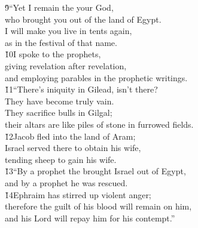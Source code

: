 \begin{poetry}
\poeml \v{9}``Yet I remain the  your God, \\
\poemll    who brought you out of the land of Egypt. \\
\poeml I will make you live in tents again, \\
\poemll    as in the festival of that name. \\
\poeml \v{10}I spoke to the prophets, \\
\poemll    giving revelation after revelation, \\
\poemlll       and employing parables in the prophetic writings. \\
\poeml \v{11}``There's iniquity in Gilead, isn't there? \\
\poemll    They have become truly vain. \\
\poeml They sacrifice bulls in Gilgal; \\
\poemll    their altars are like piles of stone in furrowed fields. \\
\poeml \v{12}Jacob fled into the land of Aram; \\
\poemll    Israel served there to obtain his wife, \\
\poemlll       tending sheep to gain his wife. \\
\poeml \v{13}``By a prophet the  brought Israel out of Egypt, \\
\poemll    and by a prophet he was rescued. \\
\poeml \v{14}Ephraim has stirred up violent anger; \\
\poemll    therefore the guilt of his blood will remain on him, \\
\poemlll       and his Lord will repay him for his contempt.''
\end{poetry}

